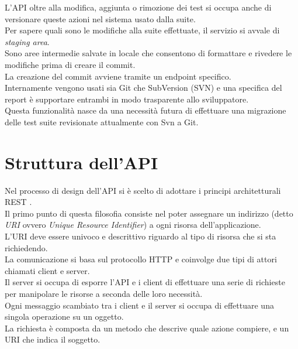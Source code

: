         L'API oltre alla modifica, aggiunta o rimozione dei test si occupa anche di versionare queste azioni nel sistema usato dalla suite.\\
        Per sapere quali sono le modifiche alla suite effettuate, il servizio si avvale di \textit{staging area}. \\
        Sono aree intermedie salvate in locale che consentono di formattare e rivedere le modifiche prima di creare il commit.\\
        La creazione del commit avviene tramite un endpoint specifico. \\

        Internamente vengono usati sia Git \cite{Git} che SubVersion (SVN) \cite{SubVersion} e una specifica del report è supportare entrambi in modo trasparente allo sviluppatore.\\
        Questa funzionalità nasce da una necessità futura di effettuare una migrazione delle test suite revisionate attualmente con Svn a Git.\\
            
    \section{Struttura dell'API}
        Nel processo di design dell'API si è scelto di adottare i principi architetturali REST \cite{REST}.\\
        Il primo punto di questa filosofia consiste nel poter assegnare un indirizzo (detto \textit{URI} ovvero \textit{Unique Resource Identifier}) a ogni risorsa dell'applicazione.\\
        L'URI deve essere univoco e descrittivo riguardo al tipo di risorsa che si sta richiedendo.\\
        
        La comunicazione si basa sul protocollo HTTP e coinvolge due tipi di attori chiamati client e server.\\
        Il server si occupa di esporre l'API e i client di effettuare una serie di richieste per manipolare le risorse a seconda delle loro necessità.\\
        Ogni messaggio scambiato tra i client e il server si occupa di effettuare una singola operazione su un oggetto.\\
        La richiesta è composta da un metodo che descrive quale azione compiere, e un URI che indica il soggetto.\\
        
